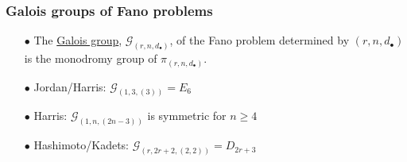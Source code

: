 \documentclass{beamer}
\theoremstyle{definition}
\newcommand{\blue}[1]{{\color{black!15!blue}\underline{#1}}}
\begin{document}
\begin{frame}
\frametitle{Galois groups of Fano problems}
\hspace{-.65cm}
\begin{minipage}{.73\textwidth}
\begin{enumerate}
\item[$\bullet$] The \blue{Galois group}, $\mathcal{G}_{(r,n,d_\bullet)}$, of the Fano problem determined by $(r,n,d_\bullet)$ is the monodromy group of $\pi_{(r,n,d_\bullet)}$.

\vspace{.1cm}

\item[$\bullet$] Jordan/Harris: $\mathcal{G}_{(1,3,(3))} = E_6$

\vspace{.1cm}

\item[$\bullet$] Harris: $\mathcal{G}_{(1,n,(2n-3))}$ is symmetric for $n\ge 4$

\vspace{.1cm}

\item[$\bullet$] Hashimoto/Kadets: $\mathcal{G}_{(r,2r+2,(2,2))} = D_{2r+3}$

\vspace{.1cm}


\end{enumerate}
\end{minipage}
\end{frame}
\end{document}
